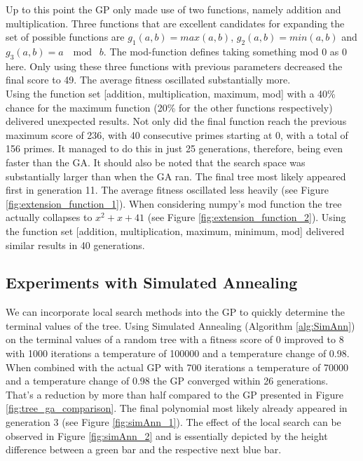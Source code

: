 \documentclass[11pt,a4paper]{article}
\begin{document}
Up to this point the GP only made use of two functions, namely addition and multiplication. Three functions that are excellent candidates for expanding the set of possible functions are $g_1(a, b)=max(a,b)$, $g_2(a, b)=min(a,b)$ and $g_3(a, b)= a \; \mod \; b$. The mod-function defines taking something mod 0 as 0 here. Only using these three functions with previous parameters decreased the final score to 49. The average fitness oscillated substantially more. 
\\
Using the function set [addition, multiplication, maximum, mod] with a 40\% chance for the maximum function (20\% for the other functions respectively) delivered unexpected results. Not only did the final function reach the previous maximum score of 236, with 40 consecutive primes starting at 0, with a total of 156 primes. It managed to do this in just 25 generations, therefore, being even faster than the GA. It should also be noted that the search space was substantially larger than when the GA ran. The final tree most likely appeared first in generation 11. The average fitness oscillated less heavily (see Figure \ref{fig:extension_function_1}). When considering numpy's mod function the tree actually collapses to $x^2 + x + 41$ (see Figure \ref{fig:extension_function_2}). Using the function set [addition, multiplication, maximum, minimum, mod] delivered similar results in 40 generations.
\subsection*{Experiments with Simulated Annealing}
We can incorporate local search methods into the GP to quickly determine the terminal values of the tree. Using Simulated Annealing (Algorithm \ref{alg:SimAnn}) on the terminal values of a random tree with a fitness score of 0 improved to 8 with 1000 iterations a temperature of 100000 and a temperature change of 0.98. When combined with the actual GP with 700 iterations a temperature of 70000 and a temperature change of 0.98 the GP converged within 26 generations. That's a reduction by more than half compared to the GP presented in Figure \ref{fig:tree_ga_comparison}. The final polynomial most likely already appeared in generation 3 (see Figure \ref{fig:simAnn_1}). The effect of the local search can be observed in Figure \ref{fig:simAnn_2} and is essentially depicted by the height difference between a green bar and the respective next blue bar.
\end{document}
